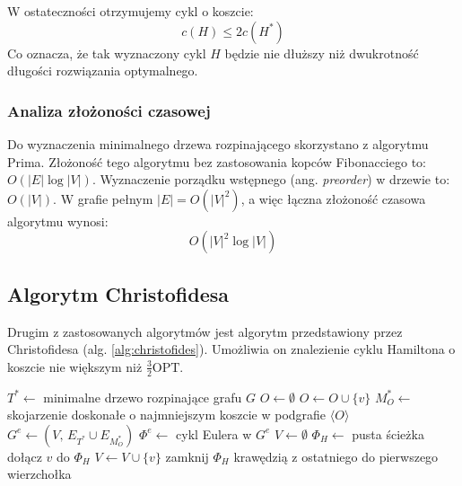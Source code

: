 \documentclass{article}
\theoremstyle{definition}
\theoremstyle{plain}
\theoremstyle{remark}
\begin{document}
    \noindent
	W ostateczności otrzymujemy cykl o koszcie:
	\begin{equation}
		c(H) \leq 2c(H^*)
	\end{equation} 
    Co oznacza, że tak wyznaczony cykl $H$ będzie nie dłuższy niż dwukrotność długości rozwiązania optymalnego.
    
	\subsubsection{Analiza złożoności czasowej}
	Do wyznaczenia minimalnego drzewa rozpinającego skorzystano z algorytmu Prima. Złożoność tego algorytmu bez zastosowania kopców Fibonacciego to: $O(|E|\log|V|)$. 
	Wyznaczenie porządku wstępnego (ang. \textit{preorder}) w drzewie to: $O(|V|)$. W grafie pełnym $|E| = O(|V|^2)$, a więc łączna złożoność czasowa algorytmu wynosi:
    \begin{equation}
	    O(|V|^2\log|V|)
    \end{equation}

\subsection{Algorytm Christofidesa}
Drugim z zastosowanych algorytmów jest algorytm przedstawiony przez Christofidesa \cite{Christofides2022} (alg. \ref{alg:christofides}). Umożliwia on znalezienie cyklu Hamiltona o koszcie nie większym niż $\frac{3}{2}\mathrm{OPT}$. 

\begin{algorithm}[H]
    \caption{Algorytm Christofidesa}
    \label{alg:christofides}
    \begin{algorithmic}[1]
        \State $T^* \gets$ minimalne drzewo rozpinające grafu $G$        \State $O \gets \emptyset$ 
                \State $O \gets O \cup \{v\}$
            \EndIf
        \EndFor
        \State $M_O^* \gets$ skojarzenie doskonałe o najmniejszym koszcie w podgrafie $\langle O \rangle$
        \State $G^e \gets (V,\, E_{T^*} \cup E_{M_O^*})$ 
        \State $\Phi^e \gets$ cykl Eulera w $G^e$
        \State $V \gets \emptyset$ 
        \State $\Phi_H \gets$ pusta ścieżka
                \State dołącz $v$ do $\Phi_H$
                \State $V \gets V \cup \{v\}$
            \EndIf
        \EndFor
        \State zamknij $\Phi_H$ krawędzią z ostatniego do pierwszego wierzchołka
    \end{algorithmic}
\end{algorithm}
\end{document}
